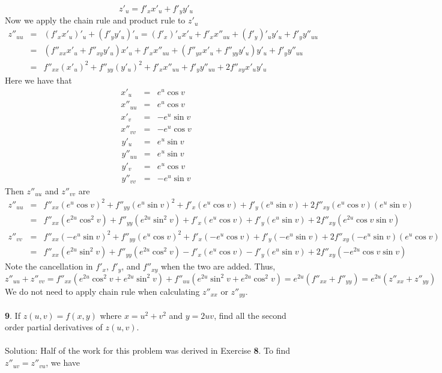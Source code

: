 \documentclass[12pt]{amsbook}
\begin{document}
$$z'_u=f'_xx'_u+f'_yy'_u$$
Now we apply the chain rule and product rule to $z'_u$
\begin{eqnarray*}
z''_{uu}&=&(f'_xx'_u)'_u+(f'_yy'_u)'_u=(f'_x)'_ux'_u+f'_xx''_{uu}+(f'_y)'_uy'_u+f'_yy''_{uu} \\
&=&(f''_{xx}x'_u+f''_{xy}y'_u)x'_u+f'_xx''_{uu}+(f''_{yx}x'_u+f''_{yy}y'_u)y'_u+f'_yy''_{uu} \\
&=& f''_{xx}(x'_u)^2+f''_{yy}(y'_u)^2+f'_xx''_{uu}+f'_yy''_{uu}+2f''_{xy}x'_uy'_u
\end{eqnarray*}
Here we have that
\begin{eqnarray*}
x'_u&=&e^u\cos v \\
x''_{uu}&=&e^u\cos v\\
x'_v&=& -e^u\sin v \\
x''_{vv}&=& -e^u\cos v 
\end{eqnarray*}
\begin{eqnarray*}
y'_u&=&e^u\sin v \\
y''_{uu}&=&e^u\sin v\\
y'_v&=& e^u\cos v \\
y''_{vv}&=& -e^u\sin v 
\end{eqnarray*}
Then $z''_{uu}$ and $z''_{vv}$ are
\begin{eqnarray*}
z''_{uu}&=&f''_{xx}(e^u \cos v)^2+f''_{yy}(e^u\sin v)^2+f'_x(e^u\cos v)+f'_y(e^u\sin v)+2f''_{xy}(e^u \cos v)(e^u\sin v) \\
&=&f''_{xx}(e^{2u}\cos^2 v)+f''_{yy}(e^{2u}\sin^2 v)+f'_x(e^u\cos v)+f'_y(e^u\sin v)+2f''_{xy}(e^{2u}\cos v\sin v) \\
z''_{vv}&=&f''_{xx}(-e^u\sin v)^2+f''_{yy}(e^u\cos v)^2+f'_x(-e^u\cos v)+f'_y(-e^u\sin v)+2f''_{xy}(-e^u\sin v)(e^u\cos v) \\
&=&f''_{xx}(e^{2u}\sin^2 v)+f''_{yy}(e^{2u}\cos^2 v)-f'_x(e^u\cos v)-f'_y(e^u\sin v)+2f''_{xy}(-e^{2u}\cos v\sin v)
\end{eqnarray*}
Note the cancellation in $f'_x$, $f'_y$, and $f''_{xy}$ when the two are added. Thus,
$$z''_{uu}+z''_{vv}=f''_{xx}(e^{2u}\cos^2 v+e^{2u}\sin^2 v)+f''_{uu}(e^{2u}\sin^2 v+e^{2u}\cos^2 v)=e^{2u}(f''_{xx}+f''_{yy})=e^{2u}(z''_{xx}+z''_{yy})$$
We do not need to apply chain rule when calculating $z''_{xx}$ or $z''_{yy}$. 
\\
\\
{\small\bf 9}. If $z(u, v) = f(x, y)$ where $x=u^2+v^2$ and $y = 2uv$, find all the second
order partial derivatives of $z(u, v)$.
\\
\\
{\sc Solution}: Half of the work for this problem was derived in Exercise {\bf 8}. To find $z''_{uv}=z''_{vu}$, we have
\end{document}
